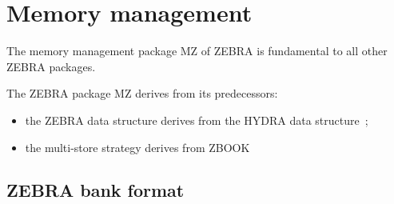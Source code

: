 \chapter{Memory management}
\label{sec:H1-MZ-memory-management}

The memory management package MZ of ZEBRA is fundamental
to all other ZEBRA packages.

The ZEBRA package MZ derives from its predecessors:

\begin{itemize}
\item the ZEBRA data structure derives from the HYDRA data structure~\cite{bib-HYDRAMZ};
\item the multi-store strategy derives from ZBOOK~\cite{bib-ZBOOK}
\end{itemize}

\section{ZEBRA bank format}

